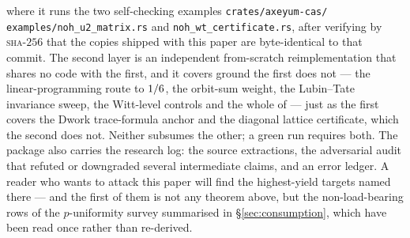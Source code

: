 \noindent
where it runs the two self-checking examples
\texttt{crates/axeyum-cas/} \texttt{examples/noh\_u2\_matrix.rs} and
\texttt{noh\_wt\_certificate.rs}, after verifying by \textsc{sha}-$256$ that
the copies shipped with this paper are byte-identical to that commit. The
second layer is an independent from-scratch reimplementation that shares no
code with the first, and it covers ground the first does not --- the
linear-programming route to $1/6$, the orbit-sum weight, the
Lubin--Tate invariance sweep, the Witt-level controls and the whole of
 --- just as the first covers the Dwork trace-formula anchor
and the diagonal lattice certificate, which the second does not. Neither
subsumes the other; a green run requires both. The package also
carries the research log: the source extractions, the adversarial audit that
refuted or downgraded several intermediate claims, and an error ledger. A
reader who wants to attack this paper will find the highest-yield targets
named there --- and the first of them is not any theorem above, but the
non-load-bearing rows of the $p$-uniformity survey summarised in
\S\ref{sec:consumption}, which have been read once rather than
re-derived.
